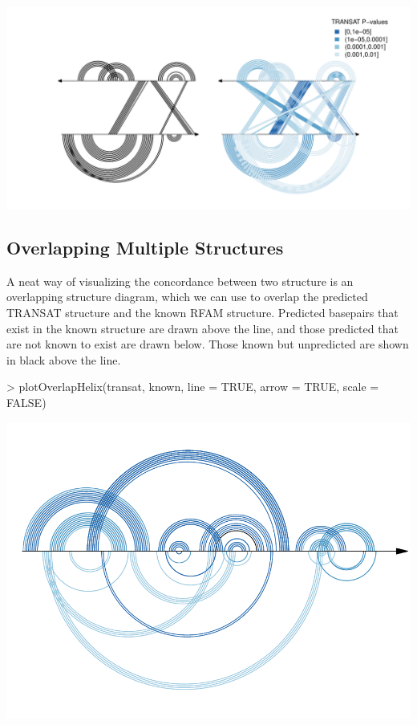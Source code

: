 \documentclass[letterpaper]{article}
\begin{document}
\begin{Schunk}
\end{Schunk}
\includegraphics{R4RNA-012}


\subsection{Overlapping Multiple Structures}

A neat way of visualizing the concordance between two structure is an
overlapping structure diagram, which we can use to overlap the predicted TRANSAT
structure and the known RFAM structure.  Predicted basepairs that exist in the
known structure are drawn above the line, and those predicted that are not known
to exist are drawn below.  Those known but unpredicted are shown in black above
the line.

\begin{Schunk}
\begin{Sinput}
> plotOverlapHelix(transat, known, line = TRUE, arrow = TRUE, scale = FALSE)
\end{Sinput}
\end{Schunk}
\includegraphics{R4RNA-013}
\end{document}
